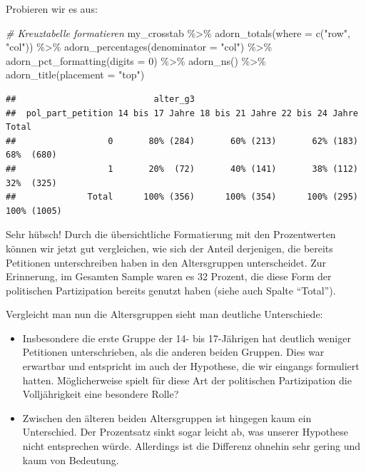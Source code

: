 \documentclass[
]{book}
\newenvironment{Shaded}{\begin{snugshade}}{\end{snugshade}}
\newcommand{\AttributeTok}[1]{\textcolor[rgb]{0.77,0.63,0.00}{#1}}
\newcommand{\CommentTok}[1]{\textcolor[rgb]{0.56,0.35,0.01}{\textit{#1}}}
\newcommand{\DecValTok}[1]{\textcolor[rgb]{0.00,0.00,0.81}{#1}}
\newcommand{\FunctionTok}[1]{\textcolor[rgb]{0.00,0.00,0.00}{#1}}
\newcommand{\NormalTok}[1]{#1}
\newcommand{\SpecialCharTok}[1]{\textcolor[rgb]{0.00,0.00,0.00}{#1}}
\newcommand{\StringTok}[1]{\textcolor[rgb]{0.31,0.60,0.02}{#1}}
\begin{document}
Probieren wir es aus:

\begin{Shaded}
\begin{Highlighting}[]
\CommentTok{\# Kreuztabelle formatieren}
\NormalTok{my\_crosstab }\SpecialCharTok{\%\textgreater{}\%} 
  \FunctionTok{adorn\_totals}\NormalTok{(}\AttributeTok{where =} \FunctionTok{c}\NormalTok{(}\StringTok{"row"}\NormalTok{, }\StringTok{"col"}\NormalTok{)) }\SpecialCharTok{\%\textgreater{}\%}
  \FunctionTok{adorn\_percentages}\NormalTok{(}\AttributeTok{denominator =} \StringTok{"col"}\NormalTok{) }\SpecialCharTok{\%\textgreater{}\%} 
  \FunctionTok{adorn\_pct\_formatting}\NormalTok{(}\AttributeTok{digits =} \DecValTok{0}\NormalTok{) }\SpecialCharTok{\%\textgreater{}\%}
  \FunctionTok{adorn\_ns}\NormalTok{() }\SpecialCharTok{\%\textgreater{}\%}
  \FunctionTok{adorn\_title}\NormalTok{(}\AttributeTok{placement =} \StringTok{"top"}\NormalTok{)}
\end{Highlighting}
\end{Shaded}

\begin{verbatim}
##                           alter_g3                                            
##  pol_part_petition 14 bis 17 Jahre 18 bis 21 Jahre 22 bis 24 Jahre       Total
##                  0       80% (284)       60% (213)       62% (183)  68%  (680)
##                  1       20%  (72)       40% (141)       38% (112)  32%  (325)
##              Total      100% (356)      100% (354)      100% (295) 100% (1005)
\end{verbatim}

Sehr hübsch! Durch die übersichtliche Formatierung mit den Prozentwerten können wir jetzt gut vergleichen, wie sich der Anteil derjenigen, die bereits Petitionen unterschreiben haben in den Altersgruppen unterscheidet. Zur Erinnerung, im Gesamten Sample waren es 32 Prozent, die diese Form der politischen Partizipation bereits genutzt haben (siehe auch Spalte ``Total'').

Vergleicht man nun die Altersgruppen sieht man deutliche Unterschiede:

\begin{itemize}
\item
  Insbesondere die erste Gruppe der 14- bis 17-Jährigen hat deutlich weniger Petitionen unterschrieben, als die anderen beiden Gruppen. Dies war erwartbar und entspricht im auch der Hypothese, die wir eingangs formuliert hatten. Möglicherweise spielt für diese Art der politischen Partizipation die Volljährigkeit eine besondere Rolle?
\item
  Zwischen den älteren beiden Altersgruppen ist hingegen kaum ein Unterschied. Der Prozentsatz sinkt sogar leicht ab, was unserer Hypothese nicht entsprechen würde. Allerdings ist die Differenz ohnehin sehr gering und kaum von Bedeutung.
\end{itemize}
\end{document}

